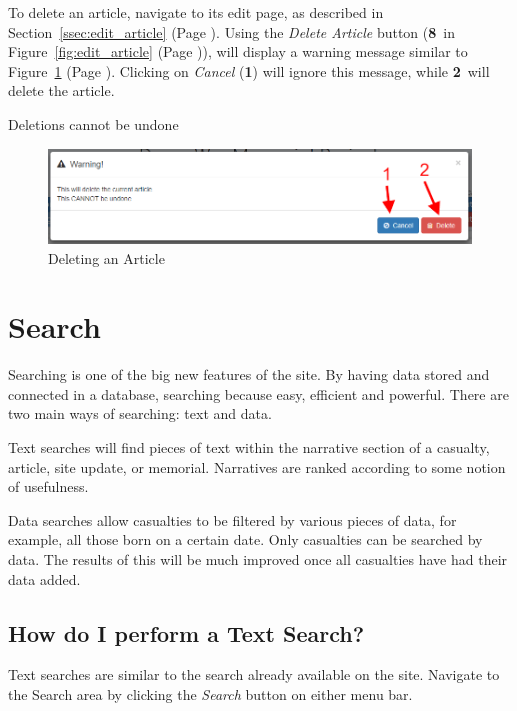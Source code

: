 \documentclass[12pt]{article}
\newcommand{\marker}[1]{\color{red}\textbf{#1}\color{black}}
\newcommand{\myref}[1]{\ref{#1} {\scriptsize(Page \pageref{#1})}}
\begin{document}
To delete an article, navigate to its edit page, as described in Section~\myref{ssec:edit_article}. Using the \textit{Delete Article} button (\marker{8}\ in Figure~\myref{fig:edit_article}), will display a warning message similar to Figure~\myref{fig:delete_article}. Clicking on \textit{Cancel} (\marker{1}) will ignore this message, while \marker{2}\ will delete the article.

\begin{warningBox}
Deletions cannot be undone
\end{warningBox}

\begin{figure}[h]
  \centering
 \includegraphics[width=.9\textwidth]{pics/delete_article.png}
	\caption{Deleting an Article}\label{fig:delete_article}
\end{figure}

\newpage
\FloatBarrier
\section{Search}\label{sec:search}

Searching is one of the big new features of the site. By having data stored and connected in a database, searching because easy, efficient and powerful. There are two main ways of searching: text and data.

Text searches will find pieces of text within the narrative section of a casualty, article, site update, or memorial. Narratives are ranked according to some notion of usefulness.

Data searches allow casualties to be filtered by various pieces of data, for example, all those born on a certain date. Only casualties can be searched by data. The results of this will be much improved once all casualties have had their data added.

\subsection{How do I perform a Text Search?}\label{ssec:text_search}

Text searches are similar to the search already available on the site. Navigate to the Search area by clicking the \textit{Search} button on either menu bar.
\end{document}
